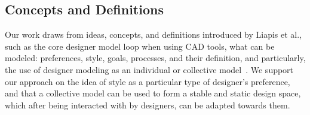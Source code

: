 \subsection{Concepts and Definitions}



Our work draws from ideas, concepts, and definitions introduced by Liapis et al., such as the core designer model loop when using CAD tools, what can be modeled: preferences, style, goals, processes, and their definition, and particularly, the use of designer modeling as an individual or collective model~\cite{p10Liapis2013-designerModel}. We support our approach on the idea of style as a particular type of designer's preference, and that a collective model can be used to form a stable and static design space, which after being interacted with by designers, can be adapted towards them.





